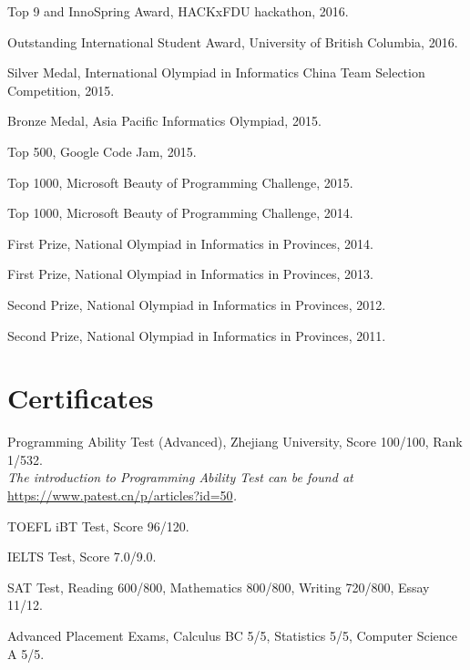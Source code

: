 \documentclass[letterpaper]{article}
\renewenvironment{itemize}{
  \begin{list}{}{
    \setlength{\leftmargin}{1.5em}
  }
}{
  \end{list}
}
\begin{document}
\begin{itemize}
  \item Top 9 and InnoSpring Award, HACKxFDU hackathon, 2016.

  \item Outstanding International Student Award, University of British Columbia, 2016.

  \item Silver Medal, International Olympiad in Informatics China Team Selection Competition, 2015.

  \item Bronze Medal, Asia Pacific Informatics Olympiad, 2015.

  \item Top 500, Google Code Jam, 2015.

  \item Top 1000, Microsoft Beauty of Programming Challenge, 2015.

  \item Top 1000, Microsoft Beauty of Programming Challenge, 2014.

  \item First Prize, National Olympiad in Informatics in Provinces, 2014.

  \item First Prize, National Olympiad in Informatics in Provinces, 2013.

  \item Second Prize, National Olympiad in Informatics in Provinces, 2012.

  \item Second Prize, National Olympiad in Informatics in Provinces, 2011.
\end{itemize}


\section*{Certificates}

\begin{itemize}
  \item Programming Ability Test (Advanced), Zhejiang University, Score 100/100, Rank 1/532.\\
  \emph{The introduction to Programming Ability Test can be found at }\url{https://www.patest.cn/p/articles?id=50}\emph{.}

  \item TOEFL iBT Test, Score 96/120.

  \item IELTS Test, Score 7.0/9.0.

  \item SAT Test, Reading 600/800, Mathematics 800/800, Writing 720/800, Essay 11/12.

  \item Advanced Placement Exams, Calculus BC 5/5, Statistics 5/5, Computer Science A 5/5.
\end{itemize}
\end{document}

